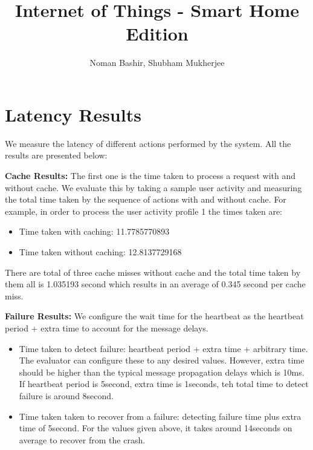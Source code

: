 \documentclass[12pt]{article}
\begin{document}
 
\title{Internet of Things - Smart Home Edition}%
\author{Noman Bashir, Shubham Mukherjee}
\maketitle

\section{Latency Results}

We measure the latency of different actions performed by the system. All the results are presented 
below: 

\noindent
\textbf{Cache Results:}
The first one is the 
time taken to process a request with and without cache. We evaluate this by taking a sample 
user activity and measuring the total time taken by the sequence of actions with and without 
cache. For example, in order to process the user activity profile 1 the times taken are:

\begin{itemize}
	\item Time taken with caching: 11.7785770893
	\item Time taken without caching: 12.8137729168
\end{itemize}

There are total of three cache misses without cache and the total time taken by them all is 
1.035193 second which results in an average of 0.345 second per cache miss. 

\noindent
\textbf{Failure Results:} We configure the wait time for the heartbeat as the heartbeat period + extra time
to account for the message delays. 

\begin{itemize}
	\item Time taken to detect failure: heartbeat period + extra time + arbitrary time. The evaluator can configure these
	to any desired values. However, extra time should be higher than the typical message propagation 
	delays which is 10ms. If heartbeat period is 5second, extra time is 1seconds, teh total time to detect failure is around 8second.
	\item Time taken taken to recover from a failure: detecting failure time plus extra time of 5second. For the 
	values given above, it takes around 14seconds on average to recover from the crash. 
\end{itemize}
\end{document}
